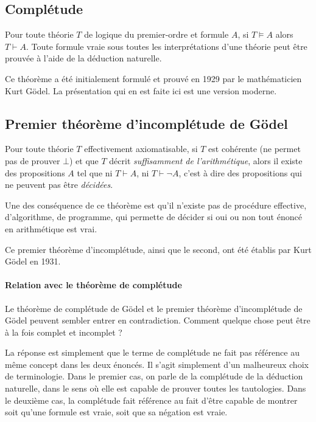 \subsection{Complétude}

Pour toute théorie $T$ de logique du premier-ordre et formule $A$, si $T \vDash A$ alors $T \vdash A$.
Toute formule vraie sous toutes les interprétations d'une théorie peut être prouvée à l'aide de la déduction naturelle.

Ce théorème a été initialement formulé et prouvé en 1929 par le mathématicien Kurt Gödel.
La présentation qui en est faite ici est une version moderne.

\subsection{Premier théorème d'incomplétude de Gödel}

Pour toute théorie $T$ effectivement axiomatisable, si $T$ est cohérente (ne permet pas de prouver $\bot$) et que $T$ décrit \textit{suffisamment de l'arithmétique}, alors il existe des propositions $A$ tel que ni $T \vdash A$, ni $T \vdash \neg A$, c'est à dire des propositions qui ne peuvent pas être \textit{décidées}.

Une des conséquence de ce théorème est qu'il n'existe pas de procédure effective, d'algorithme, de programme, qui permette de décider si oui ou non tout énoncé en arithmétique est vrai.

Ce premier théorème d'incomplétude, ainsi que le second, ont été établis par Kurt Gödel en 1931.

\paragraph{Relation avec le théorème de complétude}

Le théorème de complétude de Gödel et le premier théorème d'incomplétude de Gödel peuvent sembler entrer en contradiction.
Comment quelque chose peut être à la fois complet et incomplet ?

La réponse est simplement que le terme de complétude ne fait pas référence au même concept dans les deux énoncés.
Il s'agit simplement d'un malheureux choix de terminologie.
Dans le premier cas, on parle de la complétude de la déduction naturelle, dans le sens où elle est capable de prouver toutes les tautologies.
Dans le deuxième cas, la complétude fait référence au fait d'être capable de montrer soit qu'une formule est vraie, soit que sa négation est vraie.

